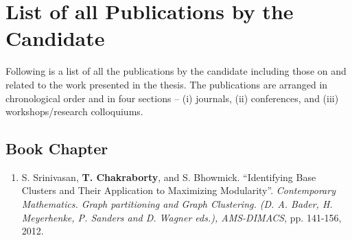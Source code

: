 \clearpage

\thispagestyle{empty}



\chapter[Appendix]{List of all Publications by the Candidate} 



Following is a list of all the publications by the candidate including those on and related to the work presented in the thesis. The
publications are arranged in chronological order and in four sections -- (i) journals, (ii)
conferences, and (iii) workshops/research colloquiums.

\section*{Book Chapter}
\begin{enumerate}

 \item S. Srinivasan, {\bf T. Chakraborty}, and S. Bhowmick. ``Identifying Base Clusters and Their Application to Maximizing
Modularity''. {\it Contemporary Mathematics. Graph partitioning and Graph Clustering. (D. A. Bader, H. Meyerhenke, P. Sanders and D. Wagner
eds.), AMS-DIMACS}, pp. 141-156, 2012.

\end{enumerate}
\fi


